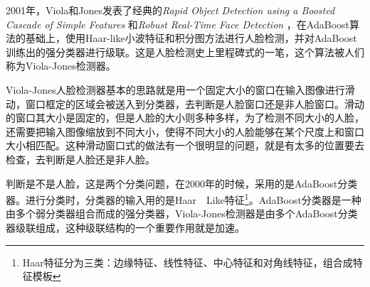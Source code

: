 2001年，Viola和Jones发表了经典的\textit{Rapid Object Detection using a Boosted Cascade of Simple Features} \cite{repid}和\textit{Robust Real-Time Face Detection} \cite{robust}，在AdaBoost算法的基础上，使用Haar-like小波特征和积分图方法进行人脸检测，并对AdaBoost训练出的强分类器进行级联。这是人脸检测史上里程碑式的一笔，这个算法被人们称为Viola-Jones检测器。

Viola-Jones人脸检测器基本的思路就是用一个固定大小的窗口在输入图像进行滑动，窗口框定的区域会被送入到分类器，去判断是人脸窗口还是非人脸窗口。滑动的窗口其大小是固定的，但是人脸的大小则多种多样，为了检测不同大小的人脸，还需要把输入图像缩放到不同大小，使得不同大小的人脸能够在某个尺度上和窗口大小相匹配。这种滑动窗口式的做法有一个很明显的问题，就是有太多的位置要去检查，去判断是人脸还是非人脸。

判断是不是人脸，这是两个分类问题，在2000年的时候，采用的是AdaBoost分类器。进行分类时，分类器的输入用的是Haar　Like特征\footnote{Haar特征分为三类：边缘特征、线性特征、中心特征和对角线特征，组合成特征模板}。AdaBoost分类器是一种由多个弱分类器组合而成的强分类器，Viola-Jones检测器是由多个AdaBoost分类器级联组成，这种级联结构的一个重要作用就是加速。